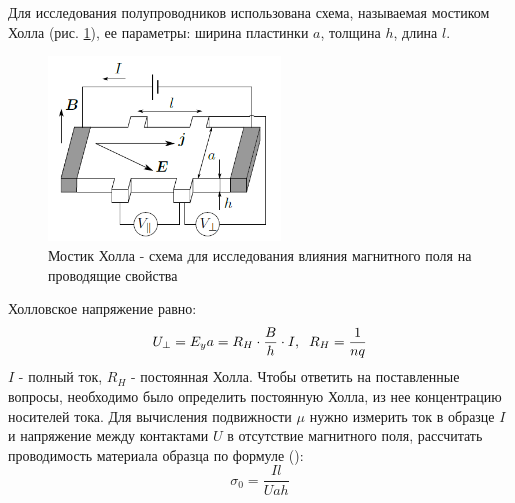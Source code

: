 \documentclass[a4paper,12pt]{article} %
\begin{document}
Для исследования полупроводников использована схема, называемая мостиком Холла (рис. \ref{мостик}), ее параметры: ширина пластинки $a$, толщина $h$,
длина $l$.
\begin{figure}[h!]
\begin{center}
\includegraphics[width=0.55\textwidth]{мостик}
\caption{Мостик Холла - схема для исследования влияния магнитного поля на проводящие свойства} \label{мостик}
\end{center}
\end{figure} 
Холловское напряжение равно:
\begin{equation}
\label{R_H}
U_\perp = E_y a=R_H\cdot \frac{B}{h}\cdot I, \hspace{2mm} R_H=\frac{1}{nq}
\end{equation}
$I$ - полный ток, $R_H$ - постоянная Холла.
Чтобы ответить на поставленные вопросы, необходимо было определить постоянную Холла, из нее концентрацию носителей тока. Для вычисления подвижности $\mu$ нужно измерить ток в образце $I$ и напряжение между контактами $U$ в отсутствие магнитного поля, рассчитать проводимость материала образца по формуле (\cite{labnik}):
\begin{equation}
\label{sigma}
\sigma_0 = \frac{Il}{Uah}
\end{equation} 
\end{document}
